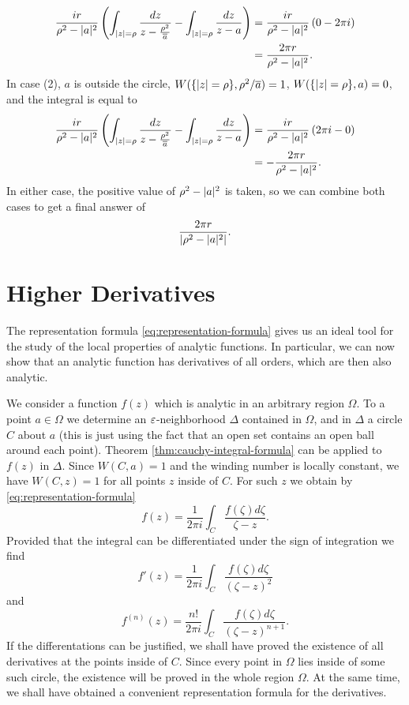 \begin{exercise}
\begin{sol}
\begin{enumerate}
\begin{align*}
\dfrac{ir}{\rho^2-\lvert a \rvert^2}\left(\int_{\lvert z \rvert=\rho}\dfrac{dz}{z-\frac{\rho^2}{\overline{a}}}-\int_{\lvert z \rvert=\rho}\dfrac{dz}{z-a}\right) &= \dfrac{ir}{\rho^2-\lvert a \rvert^2}\left(0-2\pi i\right) \\
&=\frac{2\pi r}{\rho^2-\lvert a \rvert^2}.
\end{align*}
In case (2), $a$ is outside the circle, $W(\{\lvert z \rvert=\rho\},\rho^2/\overline{a})=1$, $W(\{\lvert z \rvert=\rho\},a)=0$, and the integral is equal to
\begin{align*}
\dfrac{ir}{\rho^2-\lvert a \rvert^2}\left(\int_{\lvert z \rvert=\rho}\dfrac{dz}{z-\frac{\rho^2}{\overline{a}}}-\int_{\lvert z \rvert=\rho}\dfrac{dz}{z-a}\right) &= \dfrac{ir}{\rho^2-\lvert a \rvert^2}\left(2\pi i-0\right) \\
&=-\frac{2\pi r}{\rho^2-\lvert a \rvert^2}.
\end{align*}
In either case, the positive value of $\rho^2-\lvert a \rvert^2$ is taken, so we can combine both cases to get a final answer of $$\dfrac{2\pi r}{\lvert \rho^2-\lvert a \rvert^2 \rvert}.$$
\end{enumerate}
\end{sol}
\end{exercise}

\section{Higher Derivatives}
The representation formula \ref{eq:representation-formula} gives us an ideal tool for the study of the local properties of analytic functions. In particular, we can now show that an analytic function has derivatives of all orders, which are then also analytic.

We consider a function $f(z)$ which is analytic in an arbitrary region $\Omega$. To a point $a \in \Omega$ we determine an $\varepsilon$-neighborhood $\Delta$ contained in $\Omega$, and in $\Delta$ a circle $C$ about $a$ (this is just using the fact that an open set contains an open ball around each point). Theorem \ref{thm:cauchy-integral-formula} can be applied to $f(z)$ in $\Delta$. Since $W(C,a)=1$ and the winding number is locally constant, we have $W(C,z)=1$ for all points $z$ inside of $C$. For such $z$ we obtain by \ref{eq:representation-formula} $$f(z)=\dfrac{1}{2\pi i}\int_{C} \dfrac{f(\zeta)d\zeta}{\zeta-z}.$$ Provided that the integral can be differentiated under the sign of integration we find
\begin{equation}
f'(z)=\dfrac{1}{2\pi i}\int_{C} \dfrac{f(\zeta)d\zeta}{(\zeta-z)^2}
\end{equation}
and 
\begin{equation}
f^{(n)}(z)=\dfrac{n!}{2\pi i}\int_{C} \dfrac{f(\zeta)d\zeta}{(\zeta-z)^{n+1}}.
\end{equation}
If the differentations can be justified, we shall have proved the existence of all derivatives at the points inside of $C$. Since every point in $\Omega$ lies inside of some such circle, the existence will be proved in the whole region $\Omega$. At the same time, we shall have obtained a convenient representation formula for the derivatives.

